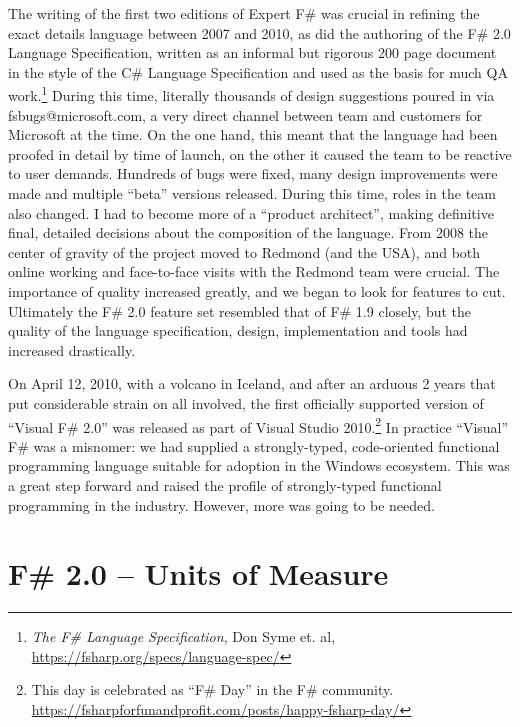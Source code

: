 \documentclass[acmsmall]{acmart}\settopmatter{}
\begin{document}
The writing of the first two editions of Expert F\# was crucial in refining the exact details language between 2007 and 2010, as did the
authoring of the F\# 2.0 Language Specification, written as an informal but rigorous 200 page document in
the style of the C\# Language Specification and used as the basis for much QA work.\footnote{\textit{The F\# Language Specification}, Don Syme et. al, \url{https://fsharp.org/specs/language-spec/}}
During this time, literally thousands of design suggestions poured in via fsbugs@microsoft.com, a very direct channel between team and
customers for Microsoft at the time. On the one hand, this meant that the language had been proofed in detail by time of launch, on the
other it caused the team to be reactive to user demands.  Hundreds of bugs were fixed, many design improvements were made and
multiple “beta” versions released.  During this time, roles in the team also changed.  I had to become more of a “product architect”, making
definitive final, detailed decisions about the composition of the language.  From 2008 the center of gravity of the project moved to
Redmond (and the USA), and both online working and face-to-face visits with the Redmond team were crucial.  The importance of
quality increased greatly, and we began to look for features to cut.  Ultimately the F\# 2.0 feature set resembled that of F\# 1.9 closely,
but the quality of the language specification, design, implementation and tools had increased drastically.

On April 12, 2010, with a volcano in Iceland, and after an arduous 2 years that put considerable strain on all involved, the first officially
supported version of “Visual F\# 2.0” was released as part of Visual Studio
2010.\footnote{This day is celebrated as “F\# Day” in the F\# community. \url{https://fsharpforfunandprofit.com/posts/happy-fsharp-day/}}
In practice “Visual” F\# was a misnomer: we had supplied a strongly-typed, code-oriented functional programming language
suitable for adoption in the Windows ecosystem.  This was a great step forward and raised the profile of strongly-typed functional
programming in the industry. However, more was going to be needed. 



\section*{F\# 2.0 – Units of Measure }
\end{document}
